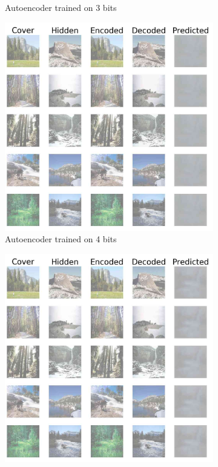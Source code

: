 \documentclass[conference]{IEEEtran}
\begin{document}
\begin{figure}[!hbt]
\begin{subfigure}[b]{0.28\textwidth}
            \caption{Autoencoder trained on 3 bits}
            \label{autoencoder_3}
    \end{subfigure}
    \hspace{0.05\textwidth}
    \begin{subfigure}[b]{0.28\textwidth}
    \centering
            \includegraphics[scale=0.13,clip=false]{images/sten_4.jpg}
            \caption{Autoencoder trained on 4 bits}
            \label{autoencoder_4}
    \end{subfigure}
    \hspace{0.05\textwidth}
    \begin{subfigure}[b]{0.28\textwidth}
    \centering
            \includegraphics[scale=0.13,clip=false]{images/sten_5.jpg}

\end{subfigure}
\end{figure}
\end{document}
